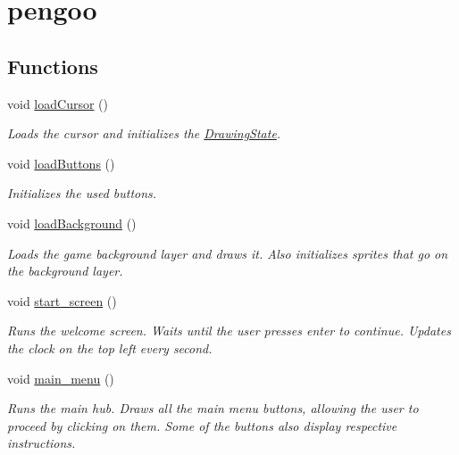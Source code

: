 \hypertarget{group__pengoo}{}\section{pengoo}
\label{group__pengoo}
\subsection*{Functions}
\begin{DoxyCompactItemize}
\item 
void \mbox{\hyperlink{group__pengoo_ga099795341d84ce8caa2e79aeccfff34f}{load\+Cursor}} ()
\begin{DoxyCompactList}\small\item\em Loads the cursor and initializes the \mbox{\hyperlink{struct_drawing_state}{Drawing\+State}}. \end{DoxyCompactList}\item 
void \mbox{\hyperlink{group__pengoo_ga95635b27f6c1165153d2c11de57e60a8}{load\+Buttons}} ()
\begin{DoxyCompactList}\small\item\em Initializes the used buttons. \end{DoxyCompactList}\item 
void \mbox{\hyperlink{group__pengoo_gab9e42b0ec1e9c9ffdf1edd5dec1b0ddd}{load\+Background}} ()
\begin{DoxyCompactList}\small\item\em Loads the game background layer and draws it. Also initializes sprites that go on the background layer. \end{DoxyCompactList}\item 
void \mbox{\hyperlink{group__pengoo_gadeb18b17fc386f53c77fbcd19dc7a8e6}{start\+\_\+screen}} ()
\begin{DoxyCompactList}\small\item\em Runs the welcome screen. Waits until the user presses enter to continue. Updates the clock on the top left every second. \end{DoxyCompactList}\item 
void \mbox{\hyperlink{group__pengoo_ga885611589f6294afada89fe88362e863}{main\+\_\+menu}} ()
\begin{DoxyCompactList}\small\item\em Runs the main hub. Draws all the main menu buttons, allowing the user to proceed by clicking on them. Some of the buttons also display respective instructions. \end{DoxyCompactList}\item 

\end{DoxyCompactItemize}
